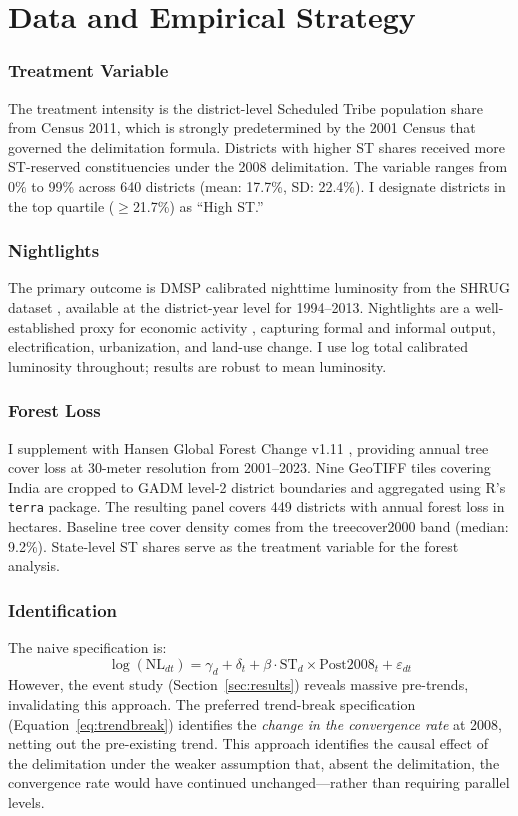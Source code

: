 \documentclass[12pt]{article}
\begin{document}
\section{Data and Empirical Strategy}\label{sec:data}

\subsubsection*{Treatment Variable} The treatment intensity is the district-level Scheduled Tribe population share from Census 2011, which is strongly predetermined by the 2001 Census that governed the delimitation formula. Districts with higher ST shares received more ST-reserved constituencies under the 2008 delimitation. The variable ranges from 0\% to 99\% across 640 districts (mean: 17.7\%, SD: 22.4\%). I designate districts in the top quartile ($\geq$21.7\%) as ``High ST.''

\subsubsection*{Nightlights} The primary outcome is DMSP calibrated nighttime luminosity from the SHRUG dataset \citep{asher2021shrug}, available at the district-year level for 1994--2013. Nightlights are a well-established proxy for economic activity \citep{henderson2012nightlights}, capturing formal and informal output, electrification, urbanization, and land-use change. I use log total calibrated luminosity throughout; results are robust to mean luminosity.

\subsubsection*{Forest Loss} I supplement with Hansen Global Forest Change v1.11 \citep{hansen2013gfc}, providing annual tree cover loss at 30-meter resolution from 2001--2023. Nine GeoTIFF tiles covering India are cropped to GADM level-2 district boundaries and aggregated using R's \texttt{terra} package. The resulting panel covers 449 districts with annual forest loss in hectares. Baseline tree cover density comes from the treecover2000 band (median: 9.2\%). State-level ST shares serve as the treatment variable for the forest analysis.

\subsubsection*{Identification} The naive specification is:
\begin{equation}
\log(\text{NL}_{dt}) = \gamma_d + \delta_t + \beta \cdot \text{ST}_d \times \text{Post2008}_t + \varepsilon_{dt}
\end{equation}
However, the event study (Section~\ref{sec:results}) reveals massive pre-trends, invalidating this approach. The preferred trend-break specification (Equation~\ref{eq:trendbreak}) identifies the \textit{change in the convergence rate} at 2008, netting out the pre-existing trend. This approach identifies the causal effect of the delimitation under the weaker assumption that, absent the delimitation, the convergence rate would have continued unchanged---rather than requiring parallel levels.
\end{document}
